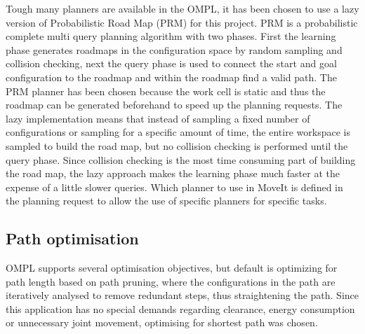 Tough many planners are available in the OMPL, it has been chosen to use a lazy version of Probabilistic Road Map (PRM) for this project. PRM is a probabilistic complete multi query planning algorithm with two phases. First the learning phase generates roadmaps in the configuration space by random sampling and collision checking, next the query phase is used to connect the start and goal configuration to the roadmap and within the roadmap find a valid path. The PRM planner has been chosen because the work cell is static and thus the roadmap can be generated beforehand to speed up the planning requests. The lazy implementation means that instead of sampling a fixed number of configurations or sampling for a specific amount of time, the entire workspace is sampled to build the road map, but no collision checking is performed until the query phase. Since collision checking is the most time consuming part of building the road map, the lazy approach makes the learning phase much faster at the expense of a little slower queries. Which planner to use in MoveIt is defined in the planning request to allow the use of specific planners for specific tasks. \\

\subsection{Path optimisation}
OMPL supports several optimisation objectives, but default is optimizing for path length based on path pruning, where the configurations in the path are iteratively analysed to remove redundant steps, thus straightening the path. Since this application has no special demands regarding clearance, energy consumption or unnecessary joint movement, optimising for shortest path was chosen.





